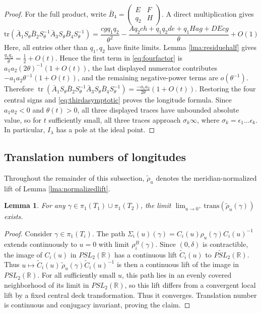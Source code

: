 \documentclass{article}
\theoremstyle{plain}
\theoremstyle{definition}
\theoremstyle{plain}
\theoremstyle{plain}
\theoremstyle{plain}
\newtheorem{lemma}[theorem]{Lemma}
\theoremstyle{remark}
\theoremstyle{remark}
\theoremstyle{plain}
\theoremstyle{plain}
\newcounter{main}
\theoremstyle{plain}
\theoremstyle{plain}
\begin{document}
\begin{proof}
For the full product, write $\bar B_4=\left(\begin{smallmatrix}E&F\\q_2&H\end{smallmatrix}\right)$. A direct multiplication gives
\begin{equation}\label{eq:fourfactor}
	\mathrm{tr}(\bar A_1S_\theta\bar B_2S_\theta^{-1}\bar A_3S_\theta\bar B_4S_\theta^{-1}) = \frac{c g q_1q_2}{\theta^2} -\frac{Aq_2ch+q_1q_2de+q_1Hag+DEcg}{\theta}+O(1)                                      
\end{equation}
Here, all entries other than $q_1,q_2$ have finite limits. Lemma \ref{lma:residuehalf} gives
$\frac{q_1q_2}{\theta}=\frac12+O(t)$. Hence the first term in \eqref{eq:fourfactor} is $a_1a_2(2\theta)^{-1}(1+O(t))$, the last displayed numerator contributes $-a_1a_2\theta^{-1}(1+O(t))$, and the remaining negative-power terms are $o(\theta^{-1})$. Therefore $\operatorname{tr}(\bar A_1S_\theta\bar B_2S_\theta^{-1}\bar A_3S_\theta\bar B_4S_\theta^{-1})=\frac{-a_1a_2}{2\theta}(1+O(t))$. Restoring the four central signs and \eqref{eq:thirdasymptotic} proves the longitude formula. Since $a_1a_2<0$ and $\theta(t)>0$, all three displayed traces have unbounded absolute value, so for $t$ sufficiently small, all three traces approach $\sigma_k\infty$, where $\sigma_k = \epsilon_1\dots\epsilon_k$. In particular, $I_\lambda$ has a pole at the ideal point.
\end{proof}

\subsection{Translation numbers of longitudes} 

Throughout the remainder of this subsection, $\widetilde\rho_u$ denotes the meridian-normalized lift of Lemma \ref{lma:normalizedlift}.

\begin{lemma}\label{lma:heightlimit}
For any $\gamma \in \pi_1(T_1) \cup \pi_1(T_2)$, the limit $\lim_{u \to 0^+}\mathrm{trans}(\widetilde\rho_u(\gamma))$ exists. 
\end{lemma}

\begin{proof}
Consider $\gamma \in \pi_1(T_i)$. The path $\Sigma_i(u)(\gamma) =  C_i(u)\rho_u(\gamma)C_i(u)^{-1}$ extends continuously to $u = 0$ with limit $\rho_i^B(\gamma)$. Since $(0, \delta)$ is contractible, the image of $C_i(u)$ in $PSL_2(\mathbb{R})$ has a continuous lift $\widetilde{C}_i(u)$ to $\widetilde{PSL}_2(\mathbb{R})$. Thus $u \mapsto \widetilde{C}_i(u)\,\widetilde\rho_u(\gamma)\widetilde{C}_i(u)^{-1}$ is then a continuous lift of the image in $PSL_2(\mathbb{R})$. For all sufficiently small $u$, this path lies in an evenly covered neighborhood of its limit in $PSL_2(\mathbb{R})$, so this lift differs from a convergent local lift by a fixed central deck transformation. Thus it converges. Translation number is continuous and conjugacy invariant, proving the claim.
\end{proof}
\end{document}
